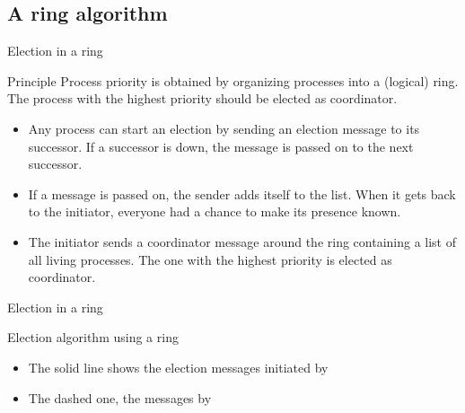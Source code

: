 \subsection{A ring algorithm}
\begin{slide}{Election in a ring}
  \begin{block}{Principle}
    Process priority is obtained by organizing processes into a (logical) ring. The process with the highest
    priority should be elected as coordinator.
    \begin{itemize}
    \item Any process can start an election by sending an election message to its successor. If a successor is
      down, the message is passed on to the next successor.
    \item If a message is passed on, the sender adds itself to the list. When it gets back to the initiator,
      everyone had a chance to make its presence known.
    \item The initiator sends a coordinator message around the ring containing a list of all living
      processes. The one with the highest priority is elected as coordinator.
    \end{itemize}
  \end{block}
\end{slide}
\begin{slide}{Election in a ring}
  \begin{block}{Election algorithm using a ring}
    \begin{center}
    \end{center}
    \begin{itemize}
    \item The solid line shows the election messages initiated by 
    \item The dashed one, the messages by 
    \end{itemize}
  \end{block}
\end{slide}
